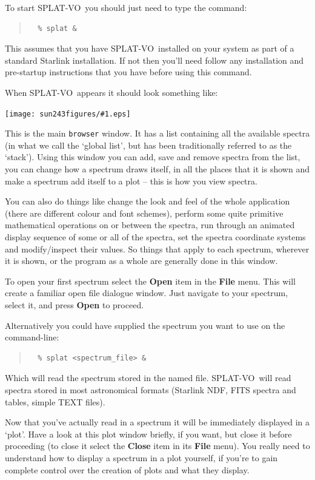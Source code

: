 \documentclass[twoside,11pt]{article}
\newcommand{\htmladdimg}[1]{}
\newcommand{\latexhtml}[2]{#1}
\renewcommand{\_}{\texttt{\symbol{95}}}
\newcommand{\SPLAT}{\textsf{SPLAT-VO}}
\newcommand{\mainfigure}[1]
{\begin{center}
 \latexhtml{\texttt{[image: sun243\_figures/\#1.eps]}}{\htmladdimg{#1.gif}}
 \end{center}
}
\newcommand{\menuitem}[1]{\textbf{#1}}
\newcommand{\hitext}[1]{\texttt{#1}}
\begin{document}
To start \SPLAT\ you should just need to type the command:
\begin{quote}
\begin{verbatim}
  % splat &
\end{verbatim}
\end{quote}
This assumes that you have \SPLAT\ installed on your system as part of a
standard Starlink installation. If not then you'll need follow any
installation and pre-startup instructions that you have before using
this command.

When \SPLAT\ appears it should look something like:

\mainfigure{browser1}

This is the main \hitext{browser} window. It has a list containing all
the available spectra (in what we call the `global list', but has been
traditionally referred to as the `stack'). Using this window you can
add, save and remove spectra from the list, you can change how a
spectrum draws itself, in all the places that it is shown and make a
spectrum add itself to a plot -- this is how you view spectra.

You can also do things like change the look and feel of the whole
application (there are different colour and font schemes), perform
some quite primitive mathematical operations on or between the
spectra, run through an animated display sequence of some or all of the
spectra, set the spectra coordinate systems and modify/inspect their
values. So things that apply to each spectrum, wherever it is shown,
or the program as a whole are generally done in this window.

To open your first spectrum select the \menuitem{Open} item in the
\menuitem{File} menu. This will create a familiar open file dialogue
window. Just navigate to your spectrum, select it, and press
\menuitem{Open} to proceed.

Alternatively you could have supplied the spectrum you want to use on
the command-line:
\begin{quote}
\begin{verbatim}
  % splat <spectrum_file> &
\end{verbatim}
\end{quote}
Which will read the spectrum stored in the named file. \SPLAT\ will read
spectra stored in most astronomical formats (Starlink NDF, FITS spectra and
tables, simple TEXT files).

Now that you've actually read in a spectrum it will be immediately
displayed in a `plot'. Have a look at this plot window briefly, if you
want, but close it before proceeding (to close it select the
\menuitem{Close} item in its \menuitem{File} menu). You really need to
understand how to display a spectrum in a plot yourself, if you're to
gain complete control over the creation of plots and what they
display.
\end{document}
